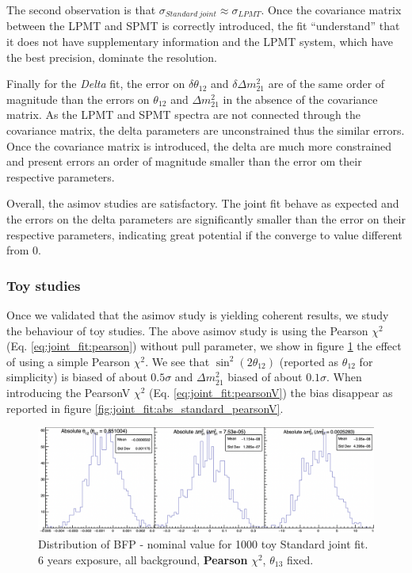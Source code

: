 \documentclass[../main.tex]{subfiles}
\begin{document}
The second observation is that $\sigma_{Standard~joint} \approx \sigma_{LPMT}$. Once the covariance matrix between the LPMT and SPMT is correctly introduced, the fit ``understand'' that it does not have supplementary information and the LPMT system, which have the best precision, dominate the resolution.

Finally for the \textit{Delta} fit, the error on $\delta \theta_{12}$ and $\delta \Delta m^2_{21}$ are of the same order of magnitude than the errors on $\theta_{12}$ and $\Delta m^2_{21}$ in the absence of the covariance matrix. As the LPMT and SPMT spectra are not connected through the covariance matrix, the delta parameters are unconstrained thus the similar errors. Once the covariance matrix is introduced, the delta are much more constrained and present errors an order of magnitude smaller than the error om their respective parameters.

Overall, the asimov studies are satisfactory. The joint fit behave as expected and the errors on the delta parameters are significantly smaller than the error on their respective parameters, indicating great potential if the converge to value different from 0.

\subsubsection{Toy studies}

Once we validated that the asimov study is yielding coherent results, we study the behaviour of toy studies. The above asimov study is using the Pearson $\chi^2$ (Eq. \ref{eq:joint_fit:pearson}) without pull parameter, we show in figure \ref{fig:joint_fit:abs_standard_pearson} the effect of using a simple Pearson $\chi^2$. We see that $\sin^2(2\theta_{12})$ (reported as $\theta_{12}$ for simplicity) is biased of about $0.5\sigma$ and $\Delta m^2_{21}$ biased of about $0.1\sigma$. When introducing the PearsonV $\chi^2$ (Eq. \ref{eq:joint_fit:pearsonV}) the bias disappear as reported in figure \ref{fig:joint_fit:abs_standard_pearsonV}.

\begin{figure}[ht]
  \centering
  \includegraphics[width=\linewidth]{images/joint_fit/absolute_standard_joint_pearson.png}
  \caption{Distribution of BFP - nominal value for 1000 toy Standard joint fit. 6 years exposure, all background, \textbf{Pearson} $\chi^2$, $\theta_{13}$ fixed.}
  \label{fig:joint_fit:abs_standard_pearson}
\end{figure}
\end{document}
